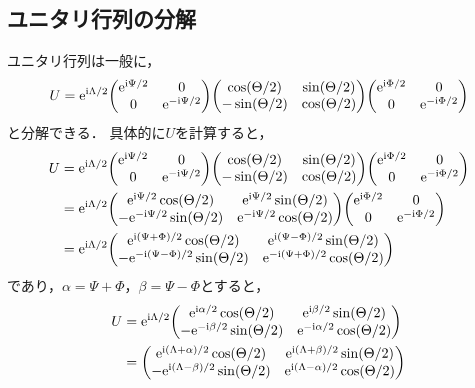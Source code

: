 \documentclass{report}
\begin{document}
  \subsection{ユニタリ行列の分解}\label{unitary-transform}
    ユニタリ行列は一般に，
    \begin{align}
      U = \e^{\i\Lambda/2}
      \mqty(
        \e^{\i\Psi/2} & 0 \\ 
        0 & \e^{-\i\Psi/2}
      )
      \mqty(
        \cos(\Theta / 2) & \sin(\Theta / 2) \\ 
        -\sin(\Theta / 2) & \cos(\Theta / 2)
      )\mqty(
        \e^{\i\Phi/2} & 0 \\ 
        0 & \e^{-\i\Phi/2}
      )
    \end{align}
    と分解できる．
    具体的に$U$を計算すると，
    \begin{align}
      U &= \e^{\i\Lambda/2}
      \mqty(
        \e^{\i\Psi/2} & 0 \\ 
        0 & \e^{-\i\Psi/2}
      )
      \mqty(
        \cos(\Theta / 2) & \sin(\Theta / 2) \\ 
        -\sin(\Theta / 2) & \cos(\Theta / 2)
      )\mqty(
        \e^{\i\Phi/2} & 0 \\ 
        0 & \e^{-\i\Phi/2}
      ) \\ 
      &= \e^{\i\Lambda/2}\mqty(
        \e^{\i\Psi/2}\cos(\Theta / 2) & \e^{\i\Psi/2}\sin(\Theta / 2) \\ 
        -\e^{-\i\Psi/2}\sin(\Theta / 2) & \e^{-\i\Psi/2}\cos(\Theta / 2)
      )\mqty(
        \e^{\i\Phi/2} & 0 \\ 
        0 & \e^{-\i\Phi/2}
      ) \\ 
      &= \e^{\i\Lambda/2}\mqty(
        \e^{\i(\Psi + \Phi) / 2}\cos(\Theta / 2) & \e^{\i(\Psi - \Phi) / 2}\sin(\Theta / 2) \\ 
        -\e^{-\i(\Psi - \Phi) / 2}\sin(\Theta / 2) & \e^{-\i(\Psi + \Phi) / 2}\cos(\Theta / 2)
      )\label{unitary-representation}
    \end{align} 
    であり，$\alpha = \Psi + \Phi$，$\beta = \Psi - \Phi$とすると，
    \begin{align}
      U &= \e^{\i\Lambda/2}\mqty(
        \e^{\i\alpha / 2}\cos(\Theta / 2) & \e^{\i\beta / 2}\sin(\Theta / 2) \\ 
        -\e^{-\i\beta / 2}\sin(\Theta / 2) & \e^{-\i\alpha / 2}\cos(\Theta / 2)
      ) \\ 
      &= \mqty(
        \e^{\i(\Lambda + \alpha) / 2}\cos(\Theta / 2) & \e^{\i(\Lambda + \beta) / 2}\sin(\Theta / 2) \\ 
        -\e^{\i(\Lambda - \beta) / 2}\sin(\Theta / 2) & \e^{\i(\Lambda - \alpha) / 2}\cos(\Theta / 2)
      ) 
    \end{align}
\end{document}
